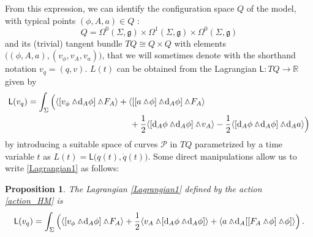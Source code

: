 \documentclass[12pt]{amsart}
\theoremstyle{plain}
\newtheorem{proposition}[theorem]{Proposition}
\theoremstyle{definition}
\theoremstyle{remark}
\newcommand{\wed}{\wedge\hspace*{-7.5pt}.\hspace*{3pt}}
\numberwithin{equation}{section}  %
\begin{document}
From this expression, we can identify the configuration space $Q$ of the model,  with typical points $(\phi,A,a)\in Q$ :
\[
Q=\Omega^0(\Sigma,\mathfrak{g})\times\Omega^1(\Sigma,\mathfrak{g})\times\Omega^0(\Sigma,\mathfrak{g})
\]
and its (trivial) tangent bundle $TQ\cong Q\times Q$ with elements $\big((\phi,A,a),(v_\phi,v_A,v_{a})\big)$, that we will sometimes denote with the shorthand notation $v_q=(q,v)$. $L(t)$ can be obtained from the Lagrangian $\mathsf{L}:TQ\rightarrow\mathbb{R}$ given by
\begin{align}\label{Lagrangian1}
\begin{split}
  \mathsf{L}(v_q)&=\int_\Sigma \Big(\langle [v_\phi\wed \mathrm{d}_A\phi]\wed F_A\rangle +\langle [[a\wed \phi]\wed \mathrm{d}_A\phi]\wed F_A\rangle \\
   &\hspace*{42mm}+\frac{1}{2}\langle [\mathrm{d}_A\phi \wed \mathrm{d}_A\phi]\wed v_A\rangle-\frac{1}{2}\langle  [\mathrm{d}_A\phi \wed \mathrm{d}_A\phi]\wed \mathrm{d}_A a \rangle\Big)
\end{split}
\end{align}
by introducing a suitable space of curves $\mathcal{P}$ in $TQ$ parametrized by a time variable $t$ as $L(t)=\mathsf{L}\big(q(t),\dot{q}(t)\big)$. Some direct manipulations allow us to write \eqref{Lagrangian1} as follows: 
\begin{proposition}
    \label{thm_Lagrangian}
The Lagrangian \eqref{Lagrangian1} defined by the action \eqref{action_HM} is
\begin{equation}\label{Lagrangian2}
 \mathsf{L}(v_q)=\int_\Sigma \Big(\langle [v_\phi\wed \mathrm{d}_A\phi]\wed F_A\rangle +\frac{1}{2}\langle v_A\wed[\mathrm{d}_A\phi \wed \mathrm{d}_A\phi]\rangle+\langle a\wed \mathrm{d}_A[[F_A\wed\phi]\wed\phi]\rangle \Big)\,.
\end{equation}
\end{proposition}
\end{document}
